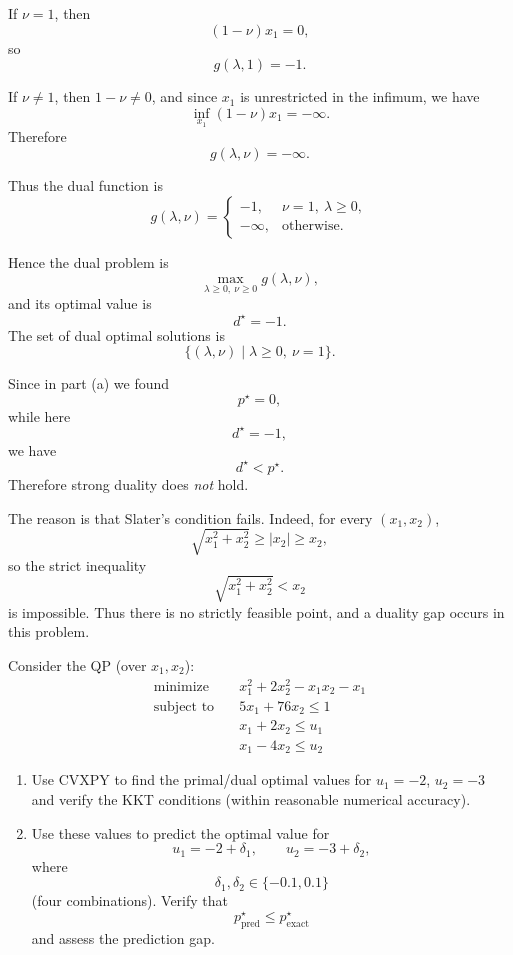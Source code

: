 \documentclass[11pt,letter,notitlepage]{article}
\theoremstyle{definition}
\begin{document}
\begin{solution}
\begin{enumerate}
    If $\nu=1$, then
    \[
    (1-\nu)x_1=0,
    \]
    so
    \[
    g(\lambda,1)=-1.
    \]

    If $\nu\neq 1$, then $1-\nu\neq 0$, and since $x_1$ is unrestricted in
    the infimum, we have
    \[
    \inf_{x_1}(1-\nu)x_1=-\infty.
    \]
    Therefore
    \[
    g(\lambda,\nu)=-\infty.
    \]

    Thus the dual function is
    \[
    g(\lambda,\nu)=
    \begin{cases}
        -1, & \nu=1,\ \lambda\ge 0,\\
        -\infty, & \text{otherwise}.
    \end{cases}
    \]

    Hence the dual problem is
    \[
    \max_{\lambda\ge 0,\ \nu\ge 0} g(\lambda,\nu),
    \]
    and its optimal value is
    \[
    d^\star=-1.
    \]
    The set of dual optimal solutions is
    \[
    \{(\lambda,\nu)\mid \lambda\ge 0,\ \nu=1\}.
    \]

    Since in part (a) we found
    \[
    p^\star=0,
    \]
    while here
    \[
    d^\star=-1,
    \]
    we have
    \[
    d^\star<p^\star.
    \]
    Therefore strong duality does \emph{not} hold.

    The reason is that Slater's condition fails. Indeed, for every
    $(x_1,x_2)$,
    \[
    \sqrt{x_1^2+x_2^2}\ge |x_2|\ge x_2,
    \]
    so the strict inequality
    \[
    \sqrt{x_1^2+x_2^2}<x_2
    \]
    is impossible. Thus there is no strictly feasible point, and a duality
    gap occurs in this problem.
\end{enumerate}

\end{solution}

\newpage
\begin{exercise}
Consider the QP (over $x_1, x_2$):
\[
\begin{aligned}
    \text{minimize} \quad & x_1^2 + 2x_2^2 - x_1x_2 - x_1 \\
    \text{subject to} \quad & 5x_1 + 76x_2 \le 1 \\
    & x_1 + 2x_2 \le u_1 \\
    & x_1 - 4x_2 \le u_2
\end{aligned}
\]

\begin{enumerate}
    \item[(a)] Use CVXPY to find the primal/dual optimal values for $u_1=-2$, $u_2=-3$ and verify the KKT conditions (within reasonable numerical accuracy).
    \item[(b)] Use these values to predict the optimal value for
    \[
    u_1=-2+\delta_1,\qquad u_2=-3+\delta_2,
    \]
    where
    \[
    \delta_1,\delta_2\in\{-0.1,0.1\}
    \]
    (four combinations). Verify that
    \[
    p^\star_{\mathrm{pred}} \le p^\star_{\mathrm{exact}}
    \]
    and assess the prediction gap.
\end{enumerate}
\end{exercise}
\end{document}
